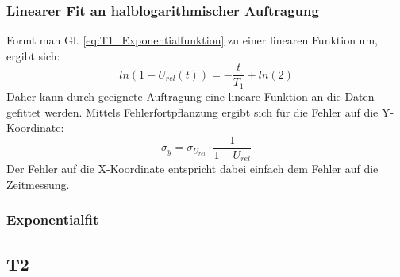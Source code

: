 \documentclass[12pt,a4paper]{article}
\begin{document}
\subsubsection{Linearer Fit an halblogarithmischer Auftragung}
Formt man Gl. \ref{eq:T1_Exponentialfunktion} zu einer linearen Funktion um, ergibt sich:
\begin{equation}
ln(1 - U_{rel} (t)) = -\dfrac{t}{T_1} + ln(2)
\label{eq:T1_linFunktion}
\end{equation}
Daher kann durch geeignete Auftragung eine lineare Funktion an die Daten gefittet werden. Mittels Fehlerfortpflanzung ergibt sich für die Fehler auf die Y-Koordinate:
\begin{equation}
\sigma _y = \sigma _{U_{rel}} \cdot \dfrac{1}{1 - U_{rel}}
\end{equation}
Der Fehler auf die X-Koordinate entspricht dabei einfach dem Fehler auf die Zeitmessung.

\subsubsection{Exponentialfit}



\subsection{T2}
\end{document}
